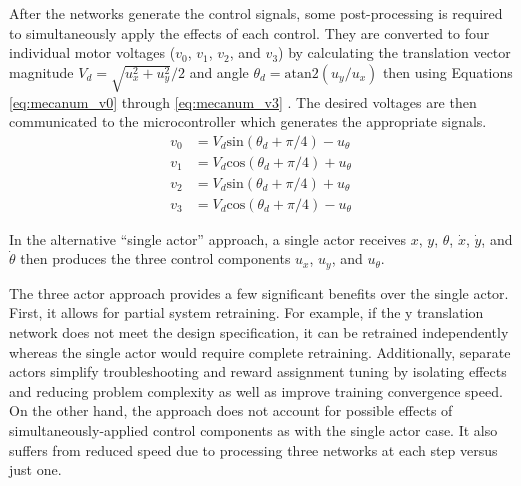 After the networks generate the control signals, some post-processing is required to simultaneously apply the effects of each control. They are converted to four individual motor voltages ($v_0$, $v_1$, $v_2$, and $v_3$) by calculating the translation vector magnitude $V_d = \sqrt{u_x^2 + u_y^2}/2$ and angle $\theta_d = \text{atan2}(u_y / u_x)$ then using Equations \ref{eq:mecanum_v0} through \ref{eq:mecanum_v3} \cite{li_2018}\cite{rahman_2014}. The desired voltages are then communicated to the microcontroller which generates the appropriate signals.
\begin{align}
v_0 &= V_d \text{sin}(\theta_d + \pi/4) - u_\theta  \label{eq:mecanum_v0}\\
v_1 &= V_d \text{cos}(\theta_d + \pi/4) + u_\theta  \label{eq:mecanum_v1}\\
v_2 &= V_d \text{sin}(\theta_d + \pi/4) + u_\theta  \label{eq:mecanum_v2}\\
v_3 &= V_d \text{cos}(\theta_d + \pi/4) - u_\theta  \label{eq:mecanum_v3}
\end{align}

In the alternative ``single actor'' approach, a single actor receives $x$, $y$, $\theta$, $\dot{x}$, $\dot{y}$, and $\dot{\theta}$ then produces the three control components $u_x$, $u_y$, and $u_\theta$. 

The three actor approach provides a few significant benefits over the single actor. First, it allows for partial system retraining. For example, if the y translation network does not meet the design specification, it can be retrained independently whereas the single actor would require complete retraining. Additionally, separate actors simplify troubleshooting and reward assignment tuning by isolating effects and reducing problem complexity as well as improve training convergence speed. On the other hand, the approach does not account for possible effects of simultaneously-applied control components as with the single actor case. It also suffers from reduced speed due to processing three networks at each step versus just one. 

